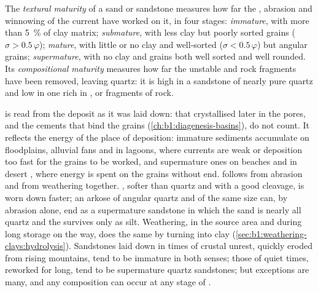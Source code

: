 \begin{definition}\label{def:b1:clastic-sediments:maturity}
The \emph{textural maturity} of a sand or sandstone
measures how far the , abrasion and winnowing of the current have
worked on it, in four stages: \emph{immature}, with more than
\qty{5}{\percent} of clay matrix; \emph{submature}, with less clay but poorly
sorted grains ($\sigma > 0.5\,\varphi$); \emph{mature}, with little or no clay
and well-sorted ($\sigma < 0.5\,\varphi$) but angular grains;
\emph{supermature}, with no clay and grains both well sorted and well rounded.
Its \emph{compositional maturity} measures how far
the unstable  and rock fragments have been removed, leaving quartz: it
is high in a sandstone of nearly pure quartz and low in one rich in ,
 or fragments of rock.
\end{definition}

 is read from the deposit as it was laid down: 
that crystallised later in the pores, and the cements that bind the grains
(\cref{ch:b1:diagenesis-basins}), do not count. It reflects the energy of the
place of deposition: immature sediments accumulate on floodplains, alluvial
fans and in lagoons, where currents are weak or deposition too fast for the
grains to be worked, and supermature ones on beaches and in desert , where
energy is spent on the grains without end.  follows from
abrasion and from weathering together. , softer than quartz and with a
good cleavage, is worn down faster; an arkose of angular quartz and  of
the same size can, by abrasion alone, end as a supermature sandstone in which
the sand is nearly all quartz and the  survives only as silt.
Weathering, in the source area and during long storage on the way, does the
same by turning  into clay (\cref{sec:b1:weathering-clays:hydrolysis}).
Sandstones laid down in times of crustal unrest, quickly eroded from rising
mountains, tend to be immature in both senses; those of quiet times,
reworked for long, tend to be supermature quartz sandstones; but exceptions
are many, and any composition can occur at any stage of .

